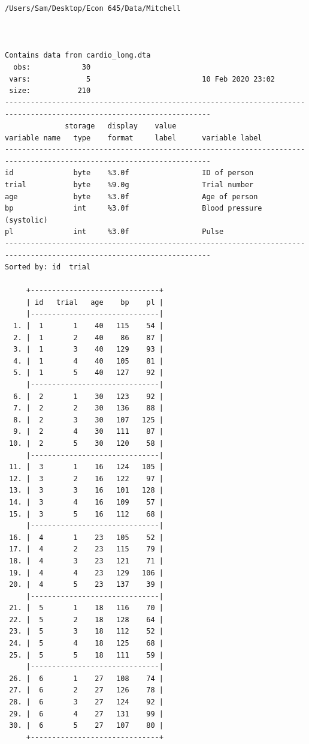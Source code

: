 \documentclass[
]{book}
\begin{document}
\begin{verbatim}
/Users/Sam/Desktop/Econ 645/Data/Mitchell



Contains data from cardio_long.dta
  obs:            30                          
 vars:             5                          10 Feb 2020 23:02
 size:           210                          
----------------------------------------------------------------------------------------------------------------------
              storage   display    value
variable name   type    format     label      variable label
----------------------------------------------------------------------------------------------------------------------
id              byte    %3.0f                 ID of person
trial           byte    %9.0g                 Trial number
age             byte    %3.0f                 Age of person
bp              int     %3.0f                 Blood pressure (systolic)
pl              int     %3.0f                 Pulse
----------------------------------------------------------------------------------------------------------------------
Sorted by: id  trial

     +------------------------------+
     | id   trial   age    bp    pl |
     |------------------------------|
  1. |  1       1    40   115    54 |
  2. |  1       2    40    86    87 |
  3. |  1       3    40   129    93 |
  4. |  1       4    40   105    81 |
  5. |  1       5    40   127    92 |
     |------------------------------|
  6. |  2       1    30   123    92 |
  7. |  2       2    30   136    88 |
  8. |  2       3    30   107   125 |
  9. |  2       4    30   111    87 |
 10. |  2       5    30   120    58 |
     |------------------------------|
 11. |  3       1    16   124   105 |
 12. |  3       2    16   122    97 |
 13. |  3       3    16   101   128 |
 14. |  3       4    16   109    57 |
 15. |  3       5    16   112    68 |
     |------------------------------|
 16. |  4       1    23   105    52 |
 17. |  4       2    23   115    79 |
 18. |  4       3    23   121    71 |
 19. |  4       4    23   129   106 |
 20. |  4       5    23   137    39 |
     |------------------------------|
 21. |  5       1    18   116    70 |
 22. |  5       2    18   128    64 |
 23. |  5       3    18   112    52 |
 24. |  5       4    18   125    68 |
 25. |  5       5    18   111    59 |
     |------------------------------|
 26. |  6       1    27   108    74 |
 27. |  6       2    27   126    78 |
 28. |  6       3    27   124    92 |
 29. |  6       4    27   131    99 |
 30. |  6       5    27   107    80 |
     +------------------------------+
\end{verbatim}
\end{document}
